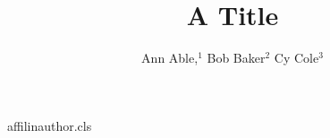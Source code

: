 \begin{filecontents*}[overwrite]{affilinauthor.cls}
\def\affilfont{\small}
\def\affil#1{\par{\reset@font\affilfont#1\par}}
\def\address#1{\par{\reset@font\affilfont#1\par}}
\def\@maketitle{\newpage{\Large\bfseries\@title\par}\vskip1em\noindent{\bfseries\@author\par}\vskip1em}
\end{filecontents*}
\documentclass{affilinauthor}

\title{A Title}
\author{Ann Able,$^1$ Bob Baker$^2$ Cy Cole$^3$
}
\maketitle
Body.

